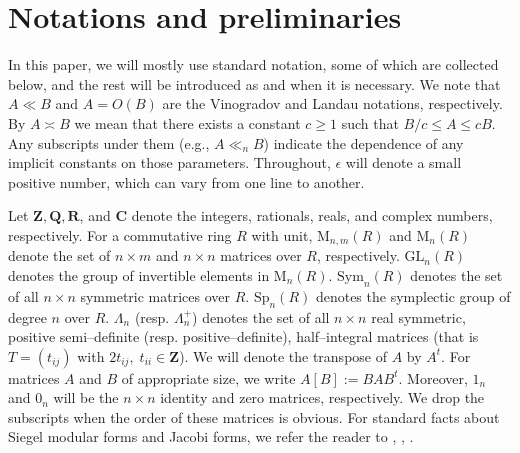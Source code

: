 \documentclass[11pt]{amsart}
\numberwithin{equation}{section}
\theoremstyle{plain}
\theoremstyle{definition}
\newcommand*{\complex}{\mathbf{C}}
\newcommand*{\Q}{\mathbf{Q}}
\newcommand{\z}{\mf Z}
\newcommand{\mf}{\mathbf}
\newcommand{\mrm}{\mathrm}
\newcommand{\tp}[1]{#1^t}
\begin{document}
\section{Notations and preliminaries}
In this paper, we will mostly use standard notation, some of which are collected below, and the rest will be introduced as and when it is necessary. We note that $A \ll B$ and $A=O(B)$ are the Vinogradov and Landau notations, respectively. By $A\asymp B$ we mean that there exists a constant $c\ge 1$ such that $B/c\le A\le cB$. Any subscripts under them (e.g., $A\ll_n B$) indicate the dependence of any implicit constants on those parameters. Throughout, $\epsilon$ will denote a small positive number, which can vary from one line to another.

Let $\z, \Q, \mf R$, and $\complex$ denote the integers,
rationals, reals, and complex numbers, respectively. For a commutative ring $R$ with unit, $\mrm M_{n,m}(R)$ and $\mrm M_n( R)$ denote the set of $n \times m$  and $n\times n$ matrices over $R$, respectively. $\mrm{GL}_n (R)$ denotes the group of invertible elements in $\mrm M_n(R)$. $\mrm{Sym}_n(R)$ denotes the set of all $n\times n$ symmetric matrices over $R$. $\mrm {Sp}_n(R)$ denotes the symplectic group of degree $n$ over $R$. $\Lambda_n$ (resp. $\Lambda_n^+$) denotes the set of all $n\times n$ real symmetric, positive semi--definite (resp. positive--definite), half--integral matrices  (that is $T=(t_{ij})$ with  $ 2t_{ij},\;t_{ii}\in \z$). We will denote the transpose of $A$ by $\tp{A}$. For matrices $A$ and $B$ of appropriate size, we write $A[B]:=BAB^t$. Moreover, $1_n$ and $0_n$ will be the $n\times n$ identity and zero matrices, respectively. We drop the subscripts when the order of these matrices is obvious. For standard facts about Siegel modular forms and Jacobi forms, we refer the reader to \cite{Fr}, \cite{klingen}, \cite{EZ}.
\end{document}
